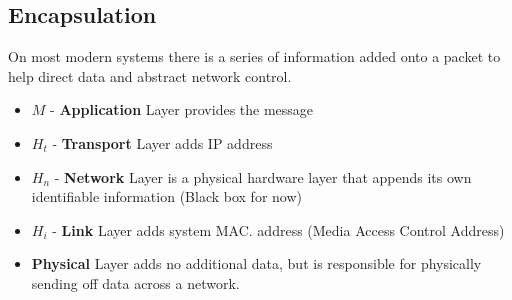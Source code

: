 \documentclass[twoside]{article}
\begin{document}
\subsection{Encapsulation}

On most modern systems there is a series of information added onto a packet to help direct data and abstract network control.
\begin{itemize}
\item $M$ - \textbf{Application} Layer provides the message
\item $H_t$ - \textbf{Transport} Layer adds IP address
\item $H_n$ - \textbf{Network } Layer is a physical hardware layer that appends its own identifiable information (Black box for now) 
\item $H_i$ - \textbf{Link} Layer adds system MAC. address (Media Access Control Address)
\item \textbf{Physical} Layer adds no additional data, but is responsible for physically sending off data across a network. 
\end{itemize}
\end{document}

